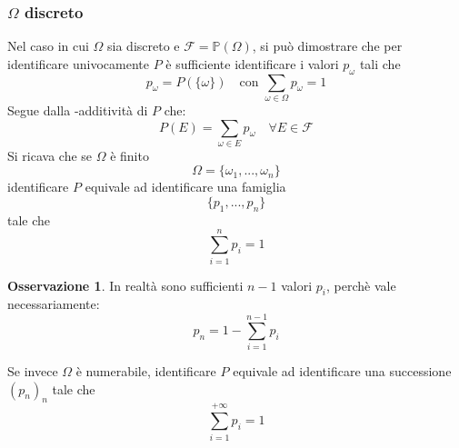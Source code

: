 \documentclass{article}
\theoremstyle{plain}
\theoremstyle{definition}
\newtheorem{osservazione}{Osservazione}[section]
\theoremstyle{remark}
\begin{document}
\subsubsection{$\Omega$ discreto} %
\label{subs:omega_discreto}
Nel caso in cui $\Omega$ sia discreto e $\mathcal{F}=\mathds{P}(\Omega)$, si può dimostrare che per identificare univocamente $P$ è sufficiente identificare i valori $p_\omega$ tali che
\begin{equation*}
	p_\omega=P(\{\omega\})\quad\text{con }\sum_{\omega\in\Omega}p_\omega=1
\end{equation*}
Segue dalla \sigma-additività di $P$ che:
\begin{equation*}
	P(E)=\sum_{\omega\in E} p_\omega\quad\forall E\in\mathcal{F}
\end{equation*}
Si ricava che se $\Omega$ è finito
\begin{equation*}
	\Omega=\{\omega_1,...,\omega_n\}
\end{equation*}
identificare $P$ equivale ad identificare una famiglia
\begin{equation*}
	\{p_1,...,p_n\}
\end{equation*}
tale che 
\begin{equation*}
	\sum_{i=1}^n p_i=1
\end{equation*}
\begin{osservazione}
	In realtà sono sufficienti $n-1$ valori $p_i$, perchè vale necessariamente:
	\begin{equation*}
		p_n=1-\sum_{i=1}^{n-1}p_i
	\end{equation*}
\end{osservazione}
Se invece $\Omega$ è numerabile, identificare $P$ equivale ad identificare una successione $(p_n)_n$ tale che
\begin{equation*}
	\sum_{i=1}^{+\infty}p_i=1
\end{equation*}
\end{document}
